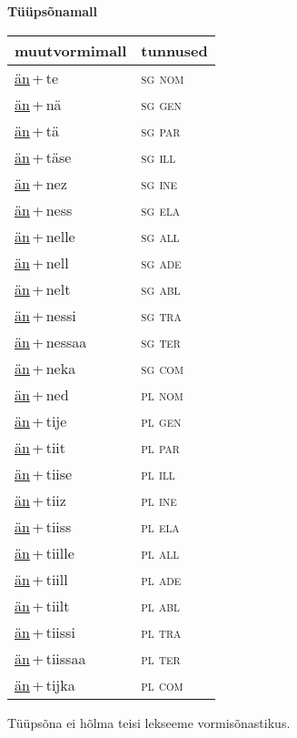 
\vspace{1.8em}
\begin{minipage}{\textwidth}
\textbf{Tüüpsõnamall \,}\\

\begin{sideways}
\begin{tabular}{l l}
muutvormimall & tunnused \\
\hline
\underline{än}\,+\,te & \textsc{ sg nom } \\
\underline{än}\,+\,nä & \textsc{ sg gen } \\
\underline{än}\,+\,tä & \textsc{ sg par } \\
\underline{än}\,+\,täse & \textsc{ sg ill } \\
\underline{än}\,+\,nez & \textsc{ sg ine } \\
\underline{än}\,+\,ness & \textsc{ sg ela } \\
\underline{än}\,+\,nelle & \textsc{ sg all } \\
\underline{än}\,+\,nell & \textsc{ sg ade } \\
\underline{än}\,+\,nelt & \textsc{ sg abl } \\
\underline{än}\,+\,nessi & \textsc{ sg tra } \\
\underline{än}\,+\,nessaa & \textsc{ sg ter } \\
\underline{än}\,+\,neka & \textsc{ sg com } \\
\underline{än}\,+\,ned & \textsc{ pl nom } \\
\underline{än}\,+\,tije & \textsc{ pl gen } \\
\underline{än}\,+\,tiit & \textsc{ pl par } \\
\underline{än}\,+\,tiise & \textsc{ pl ill } \\
\underline{än}\,+\,tiiz & \textsc{ pl ine } \\
\underline{än}\,+\,tiiss & \textsc{ pl ela } \\
\underline{än}\,+\,tiille & \textsc{ pl all } \\
\underline{än}\,+\,tiill & \textsc{ pl ade } \\
\underline{än}\,+\,tiilt & \textsc{ pl abl } \\
\underline{än}\,+\,tiissi & \textsc{ pl tra } \\
\underline{än}\,+\,tiissaa & \textsc{ pl ter } \\
\underline{än}\,+\,tijka & \textsc{ pl com } \\
\end{tabular}
\end{sideways}
\label{tab:tüüpsõnamall-änte}

\end{minipage}

 
\vspace{1em}
\noindent Tüüpsõna ei hõlma teisi lekseeme vormi\-sõnastikus.
